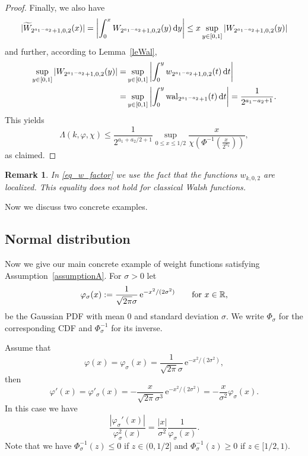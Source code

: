 \documentclass[namedate,webpdf,imanum]{ima-authoring-arxiv}%
\theoremstyle{thmstyletwo}%
\newtheorem{remark}{Remark}%
\numberwithin{equation}{section}
\newcommand{\rd}{\, {\rm d}}
\newcommand{\wal}{{\rm wal}}
\newcommand{\RR}{\mathbb{R}}
\begin{document}
\begin{proof}
Finally, we also have 
$$|\widetilde{W}_{2^{a_1-a_2}+1, 0, 2}(x)| = \left|\int_0^x   W_{2^{a_1-a_2}+1, 0, 2}(y) \rd y\right| \le x \sup_{y \in [0,1]}   |W_{2^{a_1-a_2}+1, 0, 2}(y)|$$
and further, according to Lemma~\ref{leWal},  
\begin{align*}
\sup_{y \in [0,1]} |W_{2^{a_1-a_2}+1, 0, 2}(y)| =& \sup_{y \in [0,1]} \left|\int_0^y w_{2^{a_1-a_2}+1, 0, 2}(t) \rd t\right|\\
=& \sup_{y \in [0,1]} \left|\int_0^y \wal_{2^{a_1-a_2}+1}(t) \rd t\right| = \frac{1}{2^{a_1-a_2+1}}.
\end{align*}
This yields
$$\Lambda(k,\varphi, \chi) \le \frac{1}{2^{a_1+a_2/2+1}} \sup_{0 \le x \le 1/2} \frac{x}{\chi(\Phi^{-1}(\frac{x}{2^{a_2}}))},$$ as claimed.
\end{proof}


\begin{remark} \label{rem_w_local}
In \eqref{eq_w_factor} we use the fact that the functions $w_{k,0,2}$ are localized. This equality does not hold for classical Walsh functions.
\end{remark}

Now we discuss two concrete examples.

\subsection{Normal distribution} Now we give our main concrete example of weight functions satisfying Assumption~\ref{assumptionA}. For $\sigma>0$ let 
\begin{equation}\label{def:phisigma}
\varphi_\sigma(x) :=\frac{1}{\sqrt{2 \pi} \sigma} \, {\rm e}^{-x^2/(2 \sigma^2)}\qquad \mbox{for $x \in \RR$,}
\end{equation}
be the Gaussian PDF with mean 0 and standard deviation $\sigma$. We write $\Phi_\sigma$ for the corresponding CDF and $\Phi_\sigma^{-1}$ for its inverse.

Assume that
\begin{equation*}
\varphi(x) = \varphi_\sigma(x)= \frac{1}{\sqrt{2\pi} \sigma} \, \mathrm{e}^{-x^2 / (2 \sigma^2) },
\end{equation*}
then 
\begin{equation*}
\varphi'(x)=\varphi'_\sigma(x) = -\frac{x}{\sqrt{2\pi} \sigma^3 } \, \mathrm{e}^{-x^2/ (2 \sigma^2) } =- \frac{x}{\sigma^2} \varphi_\sigma(x).
\end{equation*}
In this case we have $$\frac{|\varphi_\sigma'(x)|}{\varphi_\sigma^2(x)}=\frac{|x|}{\sigma^2} \frac{1}{\varphi_\sigma(x)}.$$ Note that we have $\Phi^{-1}_\sigma(z) \le 0$ if $z \in (0, 1/2]$ and $\Phi^{-1}_\sigma(z) \ge 0$ if $z \in [1/2,1)$.
\end{document}
